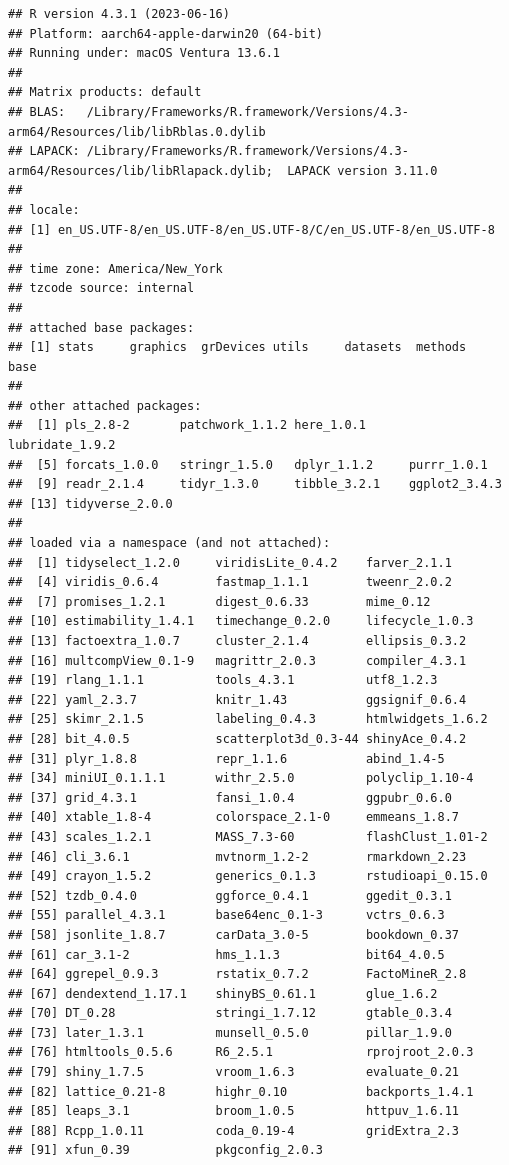 \documentclass[
]{book}
\begin{document}
\begin{verbatim}
## R version 4.3.1 (2023-06-16)
## Platform: aarch64-apple-darwin20 (64-bit)
## Running under: macOS Ventura 13.6.1
## 
## Matrix products: default
## BLAS:   /Library/Frameworks/R.framework/Versions/4.3-arm64/Resources/lib/libRblas.0.dylib 
## LAPACK: /Library/Frameworks/R.framework/Versions/4.3-arm64/Resources/lib/libRlapack.dylib;  LAPACK version 3.11.0
## 
## locale:
## [1] en_US.UTF-8/en_US.UTF-8/en_US.UTF-8/C/en_US.UTF-8/en_US.UTF-8
## 
## time zone: America/New_York
## tzcode source: internal
## 
## attached base packages:
## [1] stats     graphics  grDevices utils     datasets  methods   base     
## 
## other attached packages:
##  [1] pls_2.8-2       patchwork_1.1.2 here_1.0.1      lubridate_1.9.2
##  [5] forcats_1.0.0   stringr_1.5.0   dplyr_1.1.2     purrr_1.0.1    
##  [9] readr_2.1.4     tidyr_1.3.0     tibble_3.2.1    ggplot2_3.4.3  
## [13] tidyverse_2.0.0
## 
## loaded via a namespace (and not attached):
##  [1] tidyselect_1.2.0     viridisLite_0.4.2    farver_2.1.1        
##  [4] viridis_0.6.4        fastmap_1.1.1        tweenr_2.0.2        
##  [7] promises_1.2.1       digest_0.6.33        mime_0.12           
## [10] estimability_1.4.1   timechange_0.2.0     lifecycle_1.0.3     
## [13] factoextra_1.0.7     cluster_2.1.4        ellipsis_0.3.2      
## [16] multcompView_0.1-9   magrittr_2.0.3       compiler_4.3.1      
## [19] rlang_1.1.1          tools_4.3.1          utf8_1.2.3          
## [22] yaml_2.3.7           knitr_1.43           ggsignif_0.6.4      
## [25] skimr_2.1.5          labeling_0.4.3       htmlwidgets_1.6.2   
## [28] bit_4.0.5            scatterplot3d_0.3-44 shinyAce_0.4.2      
## [31] plyr_1.8.8           repr_1.1.6           abind_1.4-5         
## [34] miniUI_0.1.1.1       withr_2.5.0          polyclip_1.10-4     
## [37] grid_4.3.1           fansi_1.0.4          ggpubr_0.6.0        
## [40] xtable_1.8-4         colorspace_2.1-0     emmeans_1.8.7       
## [43] scales_1.2.1         MASS_7.3-60          flashClust_1.01-2   
## [46] cli_3.6.1            mvtnorm_1.2-2        rmarkdown_2.23      
## [49] crayon_1.5.2         generics_0.1.3       rstudioapi_0.15.0   
## [52] tzdb_0.4.0           ggforce_0.4.1        ggedit_0.3.1        
## [55] parallel_4.3.1       base64enc_0.1-3      vctrs_0.6.3         
## [58] jsonlite_1.8.7       carData_3.0-5        bookdown_0.37       
## [61] car_3.1-2            hms_1.1.3            bit64_4.0.5         
## [64] ggrepel_0.9.3        rstatix_0.7.2        FactoMineR_2.8      
## [67] dendextend_1.17.1    shinyBS_0.61.1       glue_1.6.2          
## [70] DT_0.28              stringi_1.7.12       gtable_0.3.4        
## [73] later_1.3.1          munsell_0.5.0        pillar_1.9.0        
## [76] htmltools_0.5.6      R6_2.5.1             rprojroot_2.0.3     
## [79] shiny_1.7.5          vroom_1.6.3          evaluate_0.21       
## [82] lattice_0.21-8       highr_0.10           backports_1.4.1     
## [85] leaps_3.1            broom_1.0.5          httpuv_1.6.11       
## [88] Rcpp_1.0.11          coda_0.19-4          gridExtra_2.3       
## [91] xfun_0.39            pkgconfig_2.0.3
\end{verbatim}
\end{document}
